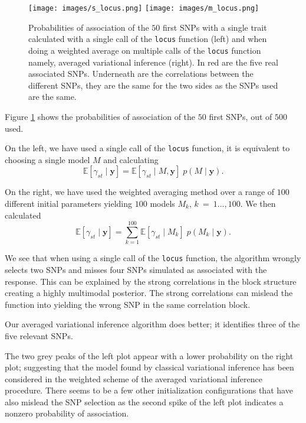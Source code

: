 \documentclass[a4paper, 11pt]{report}
\numberwithin{equation}{chapter}
\begin{document}
\begin{figure}[h]
\texttt{[image: images/s\_locus.png]}
\texttt{[image: images/m\_locus.png]}
\caption{\label{fig:simple_locus}Probabilities of association of the $50$ first SNPs with a single trait calculated with a single call of the \texttt{locus} function (left) and when doing a weighted average on multiple calls of the \texttt{locus} function namely, averaged variational inference (right). In red are the five real associated SNPs. Underneath are the correlations between the different SNPs, they are the same for the two sides as the SNPs used are the same.}
\end{figure}

Figure \ref{fig:simple_locus} shows the probabilities of association of the $50$ first SNPs, out of $500$ used.

On the left, we have used a single call of the \texttt{locus} function, it is equivalent to choosing a single model $M$ and calculating
\begin{equation*}
\mathbb{E}\left[\gamma_{st}\mid\boldsymbol{y}\right] = \mathbb{E}\left[\gamma_{st}\mid M,\boldsymbol{y}\right]\;p\left(M\mid\boldsymbol{y}\right).
\end{equation*}

On the right, we have used the weighted averaging method over a range of $100$ different initial parameters yielding $100$ models $ M_k$, $k~=~1\ldots,100$. We then calculated
\begin{equation*}
\mathbb{E}\left[\gamma_{st}\mid\boldsymbol{y}\right] = \sum_{k=1}^100\mathbb{E}\left[\gamma_{st}\mid M_k\right]\;p\left(M_k\mid\boldsymbol{y}\right).
\end{equation*}

We see that when using a single call of the \texttt{locus} function, the algorithm wrongly selects two SNPs and misses four SNPs simulated as associated with the response. This can be explained by the strong correlations in the block structure creating a highly multimodal posterior. The strong correlations can mislead the function into yielding the wrong SNP in the same correlation block.

Our averaged variational inference algorithm does better; it identifies three of the five relevant SNPs.

The two grey peaks of the left plot appear with a lower probability on the right plot; suggesting that the model found by classical variational inference has been considered in the weighted scheme of the averaged variational inference procedure. There seems to be a few other initialization configurations that have also mislead the SNP selection as the second spike of the left plot indicates a nonzero probability of association.
\end{document}
